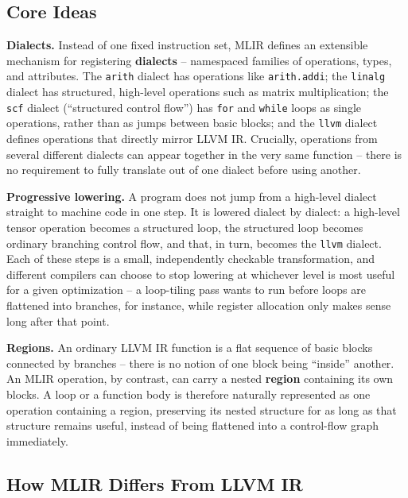 \documentclass[full-course-notes.tex]{subfiles}
\begin{document}
\subsection{Core Ideas}
\label{sec:l2-mlir-core-ideas}

\textbf{Dialects.} Instead of one fixed instruction set, MLIR defines an extensible mechanism
for registering \textbf{dialects} -- namespaced families of operations, types, and attributes.
The \texttt{arith} dialect has operations like \texttt{arith.addi}; the \texttt{linalg} dialect
has structured, high-level operations such as matrix multiplication; the \texttt{scf} dialect
(``structured control flow'') has \texttt{for} and \texttt{while} loops as single operations,
rather than as jumps between basic blocks; and the \texttt{llvm} dialect defines operations that
directly mirror LLVM IR. Crucially, operations from several different dialects can appear
together in the very same function -- there is no requirement to fully translate out of one
dialect before using another.

\textbf{Progressive lowering.} A program does not jump from a high-level dialect straight to
machine code in one step. It is lowered dialect by dialect: a high-level tensor operation
becomes a structured loop, the structured loop becomes ordinary branching control flow, and
that, in turn, becomes the \texttt{llvm} dialect. Each of these steps is a small, independently
checkable transformation, and different compilers can choose to stop lowering at whichever level
is most useful for a given optimization -- a loop-tiling pass wants to run before loops are
flattened into branches, for instance, while register allocation only makes sense long after
that point.

\textbf{Regions.} An ordinary LLVM IR function is a flat sequence of basic blocks connected by
branches -- there is no notion of one block being ``inside'' another. An MLIR operation, by
contrast, can carry a nested \textbf{region} containing its own blocks. A loop or a function body
is therefore naturally represented as one operation containing a region, preserving its nested
structure for as long as that structure remains useful, instead of being flattened into a
control-flow graph immediately.

\subsection{How MLIR Differs From LLVM IR}
\label{sec:l2-mlir-vs-llvm}
\end{document}
